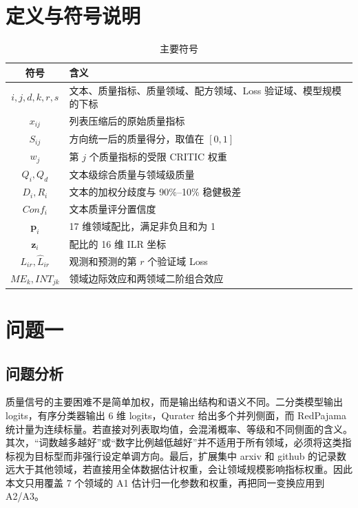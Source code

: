 \documentclass[bwprint]{gmcmthesis}
\begin{document}
\section{定义与符号说明}   %
\begin{table}[H]    %
    \centering
    \caption{主要符号}
    \label{tab:symbols}
    \begin{tabularx}{0.92\textwidth}{cL}
        \toprule
        符号 & 含义 \\
        \midrule
        $i,j,d,k,r,s$ & 文本、质量指标、质量领域、配方领域、Loss 验证域、模型规模的下标 \\
        $x_{ij}$ & 列表压缩后的原始质量指标 \\
        $S_{ij}$ & 方向统一后的质量得分，取值在 $[0,1]$ \\
        $w_j$ & 第 $j$ 个质量指标的受限 CRITIC 权重 \\
        $Q_i,Q_d$ & 文本级综合质量与领域级质量 \\
        $D_i,R_i$ & 文本的加权分歧度与 90\%--10\% 稳健极差 \\
        $Conf_i$ & 文本质量评分置信度 \\
        $\bm p_i$ & 17 维领域配比，满足非负且和为 1 \\
        $\bm z_i$ & 配比的 16 维 ILR 坐标 \\
        $L_{ir},\widehat L_{ir}$ & 观测和预测的第 $r$ 个验证域 Loss \\
        $ME_k,INT_{jk}$ & 领域边际效应和两领域二阶组合效应 \\
        \bottomrule
    \end{tabularx}
\end{table}


\section{问题一}   %
    \subsection{问题分析}   %
    质量信号的主要困难不是简单加权，而是输出结构和语义不同。二分类模型输出 logits，有序分类器输出 6 维 logits，Qurater 给出多个并列侧面，而 RedPajama 统计量为连续标量。若直接对列表取均值，会混淆概率、等级和不同侧面的含义。其次，``词数越多越好''或``数字比例越低越好''并不适用于所有领域，必须将这类指标视为目标型而非强行设定单调方向。最后，扩展集中 arxiv 和 github 的记录数远大于其他领域，若直接用全体数据估计权重，会让领域规模影响指标权重。因此本文只用覆盖 7 个领域的 A1 估计归一化参数和权重，再把同一变换应用到 A2/A3。
\end{document}
